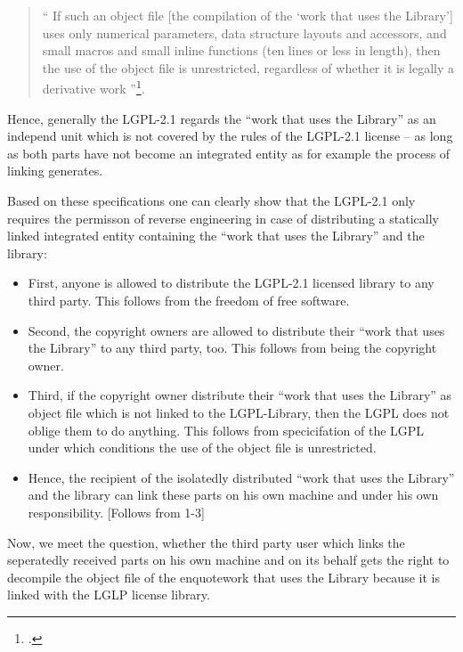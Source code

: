 \begin{quote}\enquote{ If such an object file [the compilation of the
\enquote{work that uses the Library}] uses only numerical parameters, data structure
layouts and accessors, and small macros and small inline functions (ten lines or
less in length), then the use of the object file is unrestricted, regardless of
whether it is legally a derivative work }\footcite[cf.][\nopage wp
§5]{Lgpl21OsiLicense1999a}.
\end{quote}

Hence, generally the LGPL-2.1 regards the \enquote{work that uses the Library}
as an independ unit which is not covered by the rules of the LGPL-2.1 license --
as long as both parts have not become an integrated entity as for example the
process of linking generates.

Based on these specifications one can clearly show that the LGPL-2.1 only
requires the permisson of reverse engineering in case of distributing a
statically linked integrated entity containing the \enquote{work that uses the
Library} and the library:

\begin{itemize}
\item First, anyone is allowed to distribute the LGPL-2.1 licensed library to
any third party. This follows from the freedom of free software.

\item Second, the copyright owners are allowed to distribute their \enquote{work
that uses the Library} to any third party, too. This follows from being the copyright
owner.

\item Third, if the copyright owner distribute their \enquote{work that
uses the Library} as object file which is not linked to the LGPL-Library, then
the LGPL does not oblige them to do anything. This follows from specicifation of
the LGPL under which conditions the use of the object file is unrestricted.

\item Hence, the recipient of the isolatedly distributed \enquote{work
that uses the Library} and the library can link these parts on his own machine
and under his own responsibility. [Follows from 1-3]
\end{itemize}

Now, we meet the question, whether the third party user which links the
seperatedly received parts on his own machine and on its behalf gets the right
to decompile the object file of the enquote{work that uses the Library} because it
is linked with the LGLP license library.

